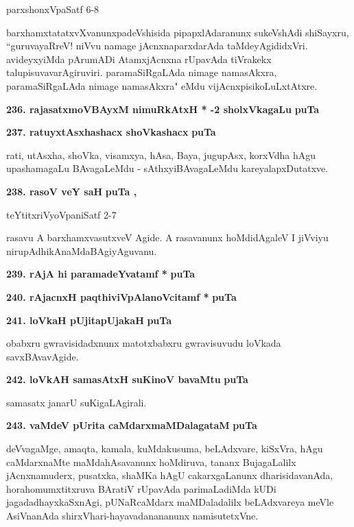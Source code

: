 \hfill{parxshonxVpaSatf 6-8}

\smallskip
barxhamxtatatxvXvanunxpadeVshisida pipapxlAdaranunx sukeVshAdi shiSayxru, ``guruvayaRreV! niVvu namage jAcnxna\-parxda\-rAda taMdeyAgididxVri. avideyxyiMda pArumADi AtamxjAcnxna rUpavAda tiVrakekx talupisuvava\-rAgiru\-viri. paramaSiRgaLAda nimage namasAkxra, paramaSiRgaLAda nimage namasAkxra" eMdu vijAcnxpisi\-koLuLx\-tAtxre.

\medskip
\noindent
\textbf{236. rajasatxmoVBAyxM nimuRkAtxH * -2 sholxVkagaLu} \hfill{\bf puTa \pageref{135}}

\medskip
\noindent
\textbf{237. ratuyxtAsxhashacx shoVkashacx} \hfill{\bf puTa \pageref{230}}

\smallskip
rati, utAsxha, shoVka, visamxya, hAsa, Baya, jugupAsx, korxVdha hAgu upashamagaLu BAvagaLeMdu - sAthxyiBAvagaLeMdu kareyalapxDutatxve.

\medskip
\noindent
\textbf{238. rasoV veY saH} \hfill{\bf puTa \pageref{223}, \pageref{231}}

\hfill{teYtitxriVyoVpaniSatf 2-7}

\smallskip
rasavu A barxhamxvasutxveV Agide. A rasavanunx hoMdidAgaleV I jiVviyu nirupAdhikAnaMda\-BAgi\-yAguvanu.

\medskip
\noindent
\textbf{239. rAjA hi paramadeYvatamf *} \hfill{\bf puTa \pageref{93}}

\medskip
\noindent
\textbf{240. rAjacnxH paqthiviVpAlanoVcitamf *} \hfill{\bf puTa \pageref{94}}


\medskip
\noindent
\textbf{241. loVkaH pUjitapUjakaH} \hfill{\bf puTa \pageref{183}}

\smallskip
obabxru gwravisidadxnunx matotxbabxru gwravisuvudu loVkada savxBAvavAgide.

\medskip
\noindent
\textbf{242. loVkAH samasAtxH suKinoV bavaMtu} \hfill{\bf puTa \pageref{47}}

\smallskip
samasatx janarU suKigaLAgirali.

\medskip
\noindent
\textbf{243. vaMdeV pUrita caMdarxmaMDalagataM} \hfill{\bf puTa \pageref{102}}

\smallskip
deVvagaMge, amaqta, kamala, kuMdakusuma, beLAdxvare, kiSxVra, hAgu caMdarxnaMte maMdahAsa\-vanunx hoMdiruva, tananx BujagaLalilx jAcnxnamuderx, pusatxka, shaMKa hAgU cakarxgaLanunx dharisidavanAda, hora\-homumxtitxruva BAratiV rUpavAda parimaLadiMda kUDi jagadadhayxkaSxnAgi, pUNaRcaMdarx maMDaladalilx beLAdxvareya meVle AsiVnanAda shirxVhari-hayavadanananunx namisutetxVne.

